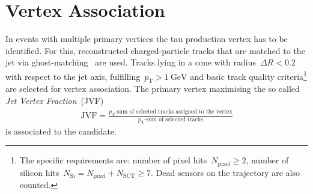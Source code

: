 \section{Vertex Association}
\label{sec:reco_vertex_assoc}
%
%
In events with multiple primary vertices the tau production vertex has to be
identified. For this, reconstructed charged-particle tracks that are matched to
the jet via ghost-matching~\cite{ghost_matching} are used.
Tracks lying in a cone with radius~$\Delta R < 0.2$ with respect to the jet
axis, fulfilling~$p_\text{T} > \SI{1}{\GeV}$ and basic track quality
criteria\footnote{The specific requirements are: number of pixel
  hits~$N_\text{pixel} \geq 2$, number of silicon
  hits~$N_\text{Si} = N_\text{pixel} + N_\text{SCT} \geq 7$. Dead sensors on the
  trajectory are also counted.} are selected for vertex association.
The primary vertex maximising the so called \emph{Jet Vertex
  Fraction}~(JVF)
\begin{align*}
  \text{JVF} = \frac{p_\text{T}\text{-sum of selected tracks assigned to the vertex}}{p_\text{T}\text{-sum of selected tracks}}
\end{align*}
is associated to the \tauhadvis candidate.

